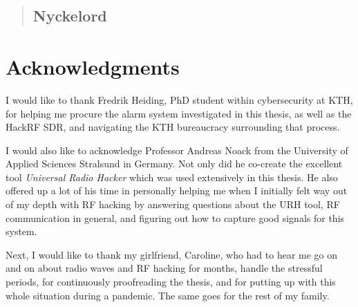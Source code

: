 \begin{abstract}
\todo

\subsection*{Nyckelord}
\todo

\end{abstract}

\clearpage

\section*{Acknowledgments}
I would like to thank Fredrik Heiding, PhD student within cybersecurity at KTH, for helping me procure the alarm system investigated in this thesis, as well as the HackRF SDR, and navigating the KTH bureaucracy surrounding that process.

I would also like to acknowledge Professor Andreas Noack from the University of Applied Sciences Stralsund in Germany. Not only did he co-create the excellent tool \textit{Universal Radio Hacker} which was used extensively in this thesis. He also offered up a lot of his time in personally helping me when I initially felt way out of my depth with RF hacking by answering questions about the URH tool, RF communication in general, and figuring out how to capture good signals for this system.

Next, I would like to thank my girlfriend, Caroline, who had to hear me go on and on about radio waves and RF hacking for months, handle the stressful periods, for continuously proofreading the thesis, and for putting up with this whole situation during a pandemic. The same goes for the rest of my family.

